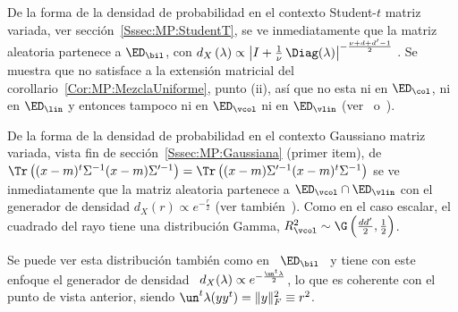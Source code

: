 \begin{ejemplo}\label{Ej:MP:StudentTMatriz}
%
  De la forma  de la densidad de probabilidad en  el contexto Student-$t$ matriz
  variada,  ver secci\'on~\ref{Sssec:MP:StudentT}, se  ve inmediatamente  que la
  matriz  aleatoria  partenece  a  $\ED_\bil$, con  $d_X\left(  \lambda  \right)
  \propto    \left|   I   +    \frac{1}{\nu}   \,    \Diag(\lambda)   \right|^{-
    \frac{\nu+d+d'-1}{2}}$  .  Se  muestra  que no  satisface  a la  extensi\'on
  matricial del corollario~\ref{Cor:MP:MezclaUniforme}, punto (ii), as\'i que no
  esta ni en  $\ED_\col$, ni en $\ED_\lin$ y entonces  tampoco ni en $\ED_\vcol$
  ni    en   $\ED_\vlin$    (ver~\cite[Ej.~1]{FanChe84}    o~\cite[ejemplo   del
  ec.~(2.3)]{Kar81}).
%
\end{ejemplo}

\begin{ejemplo}\label{Ej:MP:GaussianaMatriz}
%
  De la  forma de la  densidad de probabilidad  en el contexto  Gaussiano matriz
  variada,  vista fin  de secci\'on~\ref{Sssec:MP:Gaussiana}  (primer  item), de
  $\Tr \left( (x-m)^t \Sigma^{-1} (x-m)  \Sigma'^{-1} \right) = \Tr \left( (x-m)
    \Sigma'^{-1} (x-m)^t \Sigma^{-1} \right)$ se ve inmediatamente que la matriz
  aleatoria partenece a $\ED_\vcol \cap  \ED_\vlin$ con el generador de densidad
  $d_X(r)   \propto  e^{-\frac{r}{2}}$  (ver   tambi\'en~\cite{Daw81,  FanKot99,
    FanNad04}).   Como  en el  caso  escalar, el  cuadrado  del  rayo tiene  una
  distribuci\'on  Gamma,  $R_\vcol^2  \sim  \G\left( \frac{d  d'}{2}  ,  \frac12
  \right)$.

  Se puede ver esta distribuci\'on tambi\'en  como en \ $\ED_\bil$ \ y tiene con
  este enfoque el generador  de densidad \ $d_X(\lambda) \propto e^{-\frac{\un^t
      \lambda}{2}}$, lo que es coherente  con el punto de vista anterior, siendo
  $\un^t \lambda(y y^t) = \| y \|_F^2 \equiv r^2$.
\end{ejemplo}

